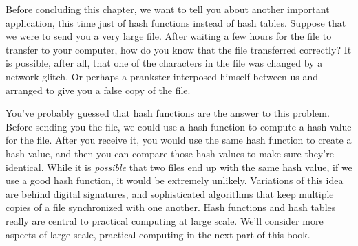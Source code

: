 Before concluding this chapter, we want to tell you about another important
application, this time just of hash functions instead of hash tables. Suppose
that we were to send you a very large file. After waiting a few hours 
for the file to transfer to your computer, how do you know that the file 
transferred correctly? It is possible, after all, that one of the characters
in the file was changed by a network glitch. Or perhaps a prankster interposed
himself between us and arranged to give you a false copy of the file.

You've probably guessed that hash functions are the answer to this problem.
Before sending you the file, we could use a hash function to compute a hash
value for the file. After you receive it, you would use the same hash function
to create a hash value, and then you can compare those hash values to make sure
they're identical. While it is \emph{possible} that two files end up with the 
same hash value, if we use a good hash function, it would be extremely unlikely. 
Variations of this idea are behind digital signatures, and sophisticated 
algorithms that keep multiple copies of a file synchronized with one another.
Hash functions and hash tables really are central to practical computing at
large scale. We'll consider more aspects of large-scale, practical computing 
in the next part of this book.

